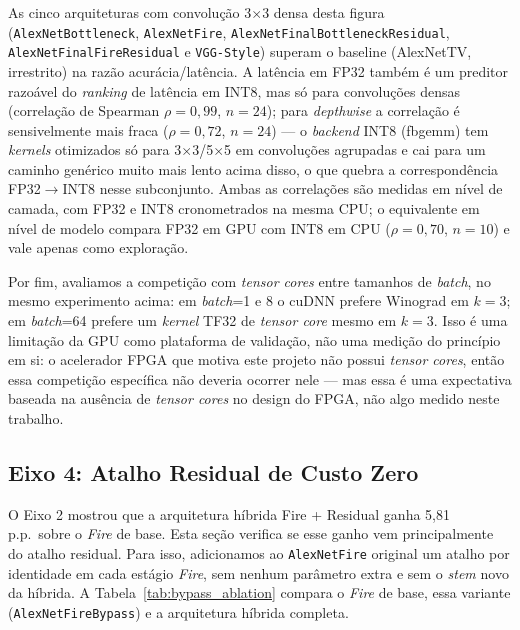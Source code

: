 \documentclass[conference]{IEEEtran}
\begin{document}
As cinco arquiteturas com convolução 3$\times$3 densa desta figura (\texttt{AlexNetBottleneck},
\texttt{AlexNetFire}, \texttt{AlexNetFinalBottleneckResidual}, \texttt{AlexNetFinalFireResidual} e
\texttt{VGG-Style}) superam o baseline (AlexNetTV, irrestrito) na razão acurácia/latência. A latência em FP32 também é
um preditor razoável do \textit{ranking} de latência em INT8, mas só para convoluções densas
(correlação de Spearman $\rho=0,99$, $n=24$); para \textit{depthwise} a correlação é sensivelmente
mais fraca ($\rho=0,72$, $n=24$) — o \textit{backend} INT8 (fbgemm) tem
\textit{kernels} otimizados só para 3$\times$3/5$\times$5 em convoluções agrupadas
\cite{khudia2021fbgemm} e cai para um
caminho genérico muito mais lento acima disso, o que quebra a correspondência FP32$\to$INT8 nesse
subconjunto. Ambas as correlações são medidas em nível de camada, com FP32 e INT8 cronometrados na
mesma CPU; o equivalente em nível de modelo compara FP32 em GPU com INT8 em CPU ($\rho=0,70$,
$n=10$) e vale apenas como exploração.

Por fim, avaliamos a competição com \textit{tensor cores} entre tamanhos de \textit{batch}, no
mesmo experimento acima: em \textit{batch}=1 e 8 o cuDNN prefere Winograd em $k{=}3$; em
\textit{batch}=64 prefere um \textit{kernel} TF32 de \textit{tensor core} mesmo em $k{=}3$. Isso é
uma limitação da GPU como plataforma de validação, não uma medição do princípio em si: o
acelerador FPGA que motiva este projeto não possui \textit{tensor cores}, então essa competição
específica não deveria ocorrer nele — mas essa é uma expectativa baseada na ausência de
\textit{tensor cores} no design do FPGA, não algo medido neste trabalho.

\subsection{Eixo 4: Atalho Residual de Custo Zero}

O Eixo 2 mostrou que a arquitetura híbrida Fire + Residual ganha 5,81 p.p.\ sobre o \textit{Fire}
de base. Esta seção verifica se esse ganho vem principalmente do atalho residual. Para isso,
adicionamos ao \texttt{AlexNetFire} original um atalho por identidade em cada estágio
\textit{Fire}, sem nenhum parâmetro extra e sem o \textit{stem} novo da híbrida. A
Tabela~\ref{tab:bypass_ablation} compara o \textit{Fire} de base, essa variante
(\texttt{AlexNetFireBypass}) e a arquitetura híbrida completa.
\end{document}
